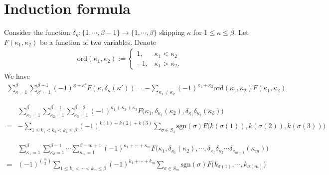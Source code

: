 \documentclass{amsart}
\begin{document}
\section{Induction formula}
{
    Consider the function $\delta_\kappa:\{1,\cdots,\beta-1\}\to\{1,\cdots,\beta\}$ skipping $\kappa$ for $1\leq \kappa\leq\beta$. Let $F(\kappa_1,\kappa_2)$ be a function of two variables. Denote 
    \begin{align*}
        \mathrm{ord}(\kappa_1,\kappa_2):=\begin{cases}
            1,&\kappa_1<\kappa_2\\
            -1,&\kappa_1>\kappa_2. 
        \end{cases}
    \end{align*}
    We have 
    \begin{align*}
        \sum_{\kappa=1}^\beta\sum_{\kappa'=1}^{\beta-1}(-1)^{\kappa+\kappa'}F(\kappa,\delta_\kappa(\kappa'))=-\sum_{\kappa_1\ne\kappa_2}(-1)^{\kappa_1+\kappa_2}\mathrm{ord}(\kappa_1,\kappa_2)F(\kappa_1,\kappa_2)
    \end{align*}

    \begin{align*}
        &\sum_{\kappa_1=1}^\beta\sum_{\kappa_2=1}^{\beta-1}\sum_{\kappa_3=1}^{\beta-2}(-1)^{\kappa_1+\kappa_2+\kappa_3}F\big(\kappa_1,\delta_{\kappa_1}(\kappa_2),\delta_{\kappa_1}\delta_{\kappa_2}(\kappa_3)\big)\\
        =&-\sum_{1\leq k_1<k_2<k_3\leq \beta}(-1)^{k(1)+k(2)+k(3)}\sum_{\sigma\in S_3}\mathrm{sgn}(\sigma)F\big(k(\sigma(1)),k(\sigma(2)),k(\sigma(3))\big)
    \end{align*}

    \begin{align*}
        &\sum_{\kappa_1=1}^\beta\sum_{\kappa_2=1}^{\beta-1}\cdots\sum_{\kappa_m=1}^{\beta-m+1}(-1)^{\kappa_1+\cdots+\kappa_m}F\Big(\kappa_1,\delta_{\kappa_1}(\kappa_2),\cdots,\delta_{\kappa_1}\delta_{\kappa_2}\cdots\delta_{\kappa_{m-1}}(\kappa_m)\Big)\\
        ={}&(-1)^{\binom{m}{2}}\sum_{1\leq k_1<\cdots<k_m\leq \beta}(-1)^{k_1+\cdots+k_m}\sum_{\sigma\in S_m}\mathrm{sgn}(\sigma)F\Big(k_{\sigma(1)},\cdots,k_{\sigma(m)}\Big)
    \end{align*}
}
\end{document}

